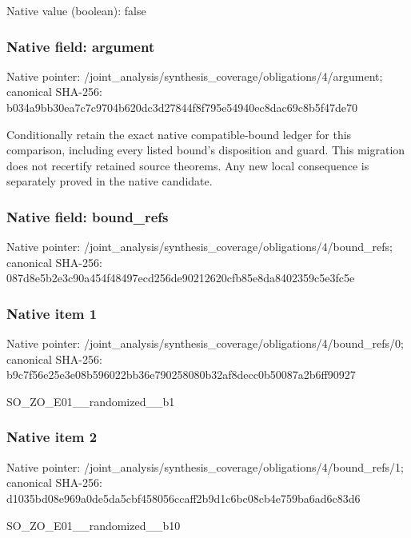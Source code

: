 \documentclass[10pt,a4paper]{article}
\begin{document}
Native value (boolean): false

\subsubsection{Native field: argument}
Native pointer: /joint\_\allowbreak{}analysis/synthesis\_\allowbreak{}coverage/obligations/4/argument; canonical SHA-256: b034a9bb30ea7c7c9704b620dc3d27844f8f795e54940ec8dac69c8b5f47de70

\begingroup\raggedright\sloppy Conditionally retain the exact native compatible-bound ledger for this comparison,\allowbreak{} including every listed bound's disposition and guard. This migration does not recertify retained source theorems. Any new local consequence is separately proved in the native candidate.\par\endgroup

\subsubsection{Native field: bound\_\allowbreak{}refs}
Native pointer: /joint\_\allowbreak{}analysis/synthesis\_\allowbreak{}coverage/obligations/4/bound\_\allowbreak{}refs; canonical SHA-256: 087d8e5b2e3c90a454f48497ecd256de90212620cfb85e8da8402359c5e3fc5e

\subsubsection{Native item 1}
Native pointer: /joint\_\allowbreak{}analysis/synthesis\_\allowbreak{}coverage/obligations/4/bound\_\allowbreak{}refs/0; canonical SHA-256: b9c7f56e25e3e08b596022bb36e790258080b32af8decc0b50087a2b6ff90927

\begingroup\raggedright\sloppy SO\_\allowbreak{}ZO\_\allowbreak{}E01\_\allowbreak{}\_\allowbreak{}randomized\_\allowbreak{}\_\allowbreak{}b1\par\endgroup

\subsubsection{Native item 2}
Native pointer: /joint\_\allowbreak{}analysis/synthesis\_\allowbreak{}coverage/obligations/4/bound\_\allowbreak{}refs/1; canonical SHA-256: d1035bd08e969a0de5da5cbf458056ccaff2b9d1c6bc08cb4e759ba6ad6c83d6

\begingroup\raggedright\sloppy SO\_\allowbreak{}ZO\_\allowbreak{}E01\_\allowbreak{}\_\allowbreak{}randomized\_\allowbreak{}\_\allowbreak{}b10\par\endgroup
\end{document}
